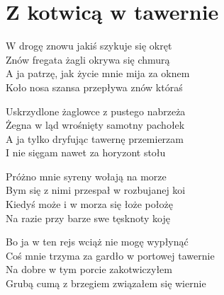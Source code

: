 \section{Z kotwicą w tawernie}
\begin{text}
W drogę znowu jakiś szykuje się okręt\\
Znów fregata żagli okrywa się chmurą\\
A ja patrzę, jak życie mnie mija za oknem\\
Koło nosa szansa przepływa znów któraś

Uskrzydlone żaglowce z pustego nabrzeża\\
Żegna w ląd wrośnięty samotny pachołek\\
A ja tylko dryfując tawernę przemierzam\\
I nie sięgam nawet za horyzont stołu

Próżno mnie syreny wołają na morze\\
Bym się z nimi przespał w rozbujanej koi\\
Kiedyś może i w morza się łoże położę\\
Na razie przy barze swe tęsknoty koję

Bo ja w ten rejs wciąż nie mogę wypłynąć\\
Coś mnie trzyma za gardło w portowej tawernie\\
Na dobre w tym porcie zakotwiczyłem\\
Grubą cumą z brzegiem związałem się wiernie
\end{text}